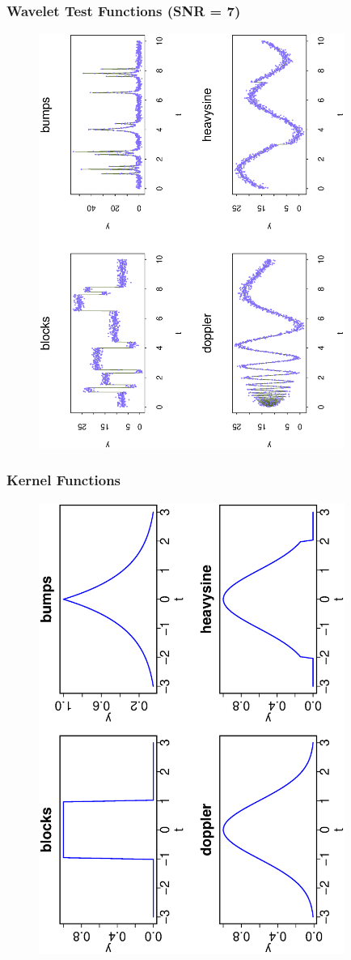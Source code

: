 \documentclass[dvips]{beamer}
\newcommand{\bs}[2]{\begin{frame} \frametitle{#1} 
{#2}
\end{frame} }
\begin{document}
\bs{Wavelet Test Functions (SNR = 7)} {
\begin{figure}[!h]
  \begin{center}
    \includegraphics[angle=270,origin=l,totalheight=6truecm,
     clip=1,width=10cm]{wavedata.ps}
  \end{center}
\end{figure}
}

\bs{Kernel Functions}{
\begin{figure}[!h]
  \begin{center}
    \includegraphics[angle=270,origin=l,totalheight=6truecm,
     clip=1,width=10cm]{kerplot.ps}
  \end{center}
\end{figure}
}
\end{document}

